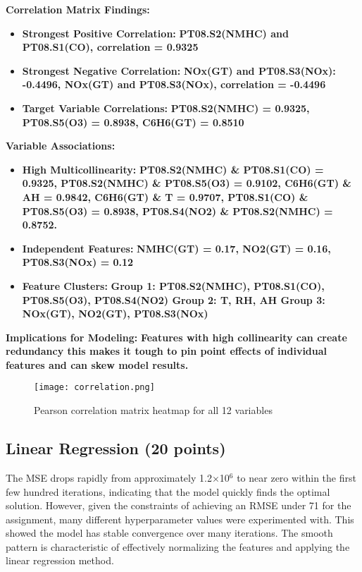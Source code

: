 \documentclass{article}
\begin{document}
\textbf{Correlation Matrix Findings:}
\begin{itemize}
    \item \textbf{Strongest Positive Correlation:} \textbf{PT08.S2(NMHC) and PT08.S1(CO), correlation = 0.9325}
    \item \textbf{Strongest Negative Correlation:} \textbf{NOx(GT) and PT08.S3(NOx): -0.4496, NOx(GT) and PT08.S3(NOx), correlation = -0.4496}
    \item \textbf{Target Variable Correlations:} \textbf{PT08.S2(NMHC) = 0.9325, PT08.S5(O3) = 0.8938, C6H6(GT) = 0.8510}
\end{itemize}

\textbf{Variable Associations:}
\begin{itemize}
    \item \textbf{High Multicollinearity:} \textbf{
PT08.S2(NMHC) \& PT08.S1(CO) = 0.9325, 
PT08.S2(NMHC) \& PT08.S5(O3) = 0.9102, 
C6H6(GT) \& AH = 0.9842, 
C6H6(GT) \& T = 0.9707, 
PT08.S1(CO) \& PT08.S5(O3) = 0.8938, 
PT08.S4(NO2) \& PT08.S2(NMHC) = 0.8752.
}



    \item \textbf{Independent Features:} \textbf{NMHC(GT) = 0.17, 
NO2(GT) = 0.16, 
PT08.S3(NOx) = 0.12
}
    \item \textbf{Feature Clusters:} \textbf{Group 1: PT08.S2(NMHC), PT08.S1(CO), PT08.S5(O3), PT08.S4(NO2) Group 2: T, RH, AH Group 3: NOx(GT), NO2(GT), PT08.S3(NOx)}
\end{itemize}

\textbf{Implications for Modeling:}
\textbf{Features with high collinearity can create redundancy this makes it tough to pin point effects of individual features and can skew model results.}

\begin{figure}[h!]
    \centering
    \texttt{[image: correlation.png]}
    \caption{Pearson correlation matrix heatmap for all 12 variables}
    \label{fig:correlation_heatmap}
\end{figure}




\subsection*{Linear Regression (20 points)}

The MSE drops rapidly from approximately 1.2×10$^6$ to near zero within the first few hundred iterations, indicating that the model quickly finds the optimal solution. However, given the constraints of achieving an RMSE under 71 for the assignment, many different hyperparameter values were experimented with. This showed the model has stable convergence over many iterations. The smooth pattern is characteristic of effectively normalizing the features and applying the linear regression method.
\end{document}
